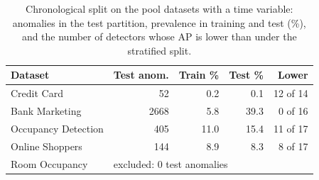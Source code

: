 \documentclass[conference]{IEEEtran}
\begin{document}
\begin{table}[t]
\caption{Chronological split on the pool datasets with a time variable: anomalies in the test partition, prevalence in training and test (\%), and the number of detectors whose AP is lower than under the stratified split.}
\label{tab:pool-chrono}
\centering
\footnotesize
\setlength{\tabcolsep}{4pt}
\begin{tabular}{lrrrr}
\toprule
Dataset & Test anom. & Train \% & Test \% & Lower \\
\midrule
Credit Card & 52 & 0.2 & 0.1 & 12 of 14 \\
Bank Marketing & 2668 & 5.8 & 39.3 & 0 of 16 \\
Occupancy Detection & 405 & 11.0 & 15.4 & 11 of 17 \\
Online Shoppers & 144 & 8.9 & 8.3 & 8 of 17 \\
Room Occupancy & \multicolumn{4}{l}{excluded: 0 test anomalies} \\
\bottomrule
\end{tabular}
\end{table}

\end{document}
